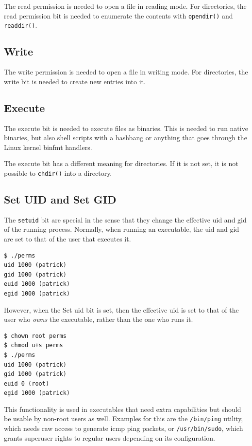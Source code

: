 \documentclass[a4paper]{article}
\begin{document}
The read permission is needed to open a file in reading mode. For directories, the read permission bit is needed to enumerate the contents with \verb|opendir()| and \verb|readdir()|.

\subsection{Write}

The write permission is needed to open a file in writing mode. For directories, the write bit is needed to create new entries into it.

\subsection{Execute}

The execute bit is needed to execute files as binaries. This is needed to run native binaries, but also shell scripts with a hashbang or anything that goes through the Linux kernel binfmt handlers.


The execute bit has a different meaning for directories. If it is not set, it is not possible to \verb|chdir()| into a directory.

\subsection{Set UID and Set GID}

The \verb|setuid| bit are special in the sense that they change the effective \gls{uid} and \gls{gid} of the running process. Normally, when running an executable, the \gls{uid} and \gls{gid} are set to that of the user that executes it.

\begin{verbatim}
$ ./perms
uid 1000 (patrick)
gid 1000 (patrick)
euid 1000 (patrick)
egid 1000 (patrick)  
\end{verbatim}
However, when the Set \gls{uid} bit is set, then the effective \gls{uid} is set to that of the user who \emph{owns} the executable, rather than the one who runs it.

\begin{verbatim}
$ chown root perms
$ chmod u+s perms
$ ./perms
uid 1000 (patrick)
gid 1000 (patrick)
euid 0 (root)
egid 1000 (patrick)  
\end{verbatim}
This functionality is used in executables that need extra capabilities but should be usable by non-root users as well. Examples for this are the \verb|/bin/ping| utility, which needs raw access to generate \gls{icmp} ping packets, or \verb|/usr/bin/sudo|, which grants superuser rights to regular users depending on its configuration.
\end{document}
